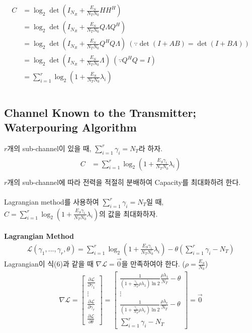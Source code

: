 \documentclass{article}
\newcommand{\bd}{\textbf} %
\begin{document}
\begin{gather}
\begin{split}
C &=\log_2 \det(I_{N_R}+\frac{E_S}{N_T N_0}HH^H)\\
&=\log_2 \det(I_{N_R}+\frac{E_S}{N_T N_0}Q\Lambda Q^H)\\
&=\log_2 \det(I_{N_R}+\frac{E_S}{N_T N_0}Q^HQ\Lambda)\ (\because \det(I+AB)=\det(I+BA))\\
&=\log_2 \det(I_{N_R}+\frac{E_S}{N_T N_0}\Lambda)\ (\because Q^HQ=I)\\
&=\sum_{i=1}^r\log_2 (1+\frac{E_S}{N_T N_0}\lambda_i)\\
\end{split}
\end{gather}

\subsection{Channel Known to the Transmitter; Waterpouring Algorithm}
$r$개의 sub-channel이 있을 때, $\sum_{i=1}^r\gamma_i=N_T$라 하자.
\begin{gather}
\begin{split}
C &=\sum_{i=1}^r\log_2 (1+\frac{E_S\gamma_i}{N_T N_0}\lambda_i)\\
\end{split}
\end{gather}
$r$개의 sub-channel에 따라 전력을 적절히 분배하여 Capacity를 최대화하려 한다.\\
\\
Lagrangian method를 사용하여 $\sum_{i=1}^r\gamma_i=N_T$일 때, $C =\sum_{i=1}^r\log_2 (1+\frac{E_S\gamma_i}{N_T N_0}\lambda_i)$의 값을 최대화하자.\\
\\
\bd{Lagrangian Method}
\begin{gather}
\mathcal{L}(\gamma_1, ..., \gamma_{r}, \theta)=\sum_{i=1}^r\log_2 (1+\frac{E_S\gamma_i}{N_T N_0}\lambda_i)-\theta(\sum_{i=1}^r\gamma_i-N_T)
\end{gather}
Lagrangian이 식(6)과 같을 때 $\nabla\mathcal{L} = \vec{0}$을 만족하여야 한다. ($\rho=\frac{E_S}{N_0}$)
\begin{gather}
\nabla\mathcal{L}=
\begin{bmatrix}
\frac{\partial \mathcal{L}}{\partial \gamma_1}\\
\vdots\\
\frac{\partial \mathcal{L}}{\partial \gamma_r}\\
\frac{\partial \mathcal{L}}{\partial \theta}
\end{bmatrix}
=
\begin{bmatrix}
\frac{1}{(1+\frac{\gamma_1}{N_T}\rho\lambda_1)\ln2}\frac{\rho\lambda_1}{N_T}-\theta\\
\vdots\\
\frac{1}{(1+\frac{\gamma_r}{N_T}\rho\lambda_r)\ln2}\frac{\rho\lambda_r}{N_T}-\theta\\
\sum_{i=1}^r\gamma_i-N_T
\end{bmatrix}
=\vec{0}
\end{gather}
\end{document}
